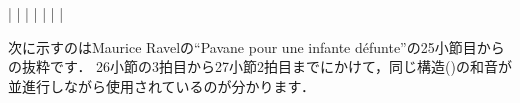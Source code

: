 \documentclass[dvipdfmx,uplatex,b5paper,openany,jbase=12Q,nomag*,textwidth-limit=44%
               ]{gachimuchi}
\begin{document}
\begin{Music}
  \generalmeter{\meterC}%
  \Startpiece%
  \NOTEs
  |%
  \en\bar
  \NOTEs
  |%
  \en\bar
  \NOTEs
  |%
  \en\bar
  \NOTEs
  |%
  \en\setdoublebar
  \endpiece\vspace{-.5\baselineskip}%
\end{Music}

次に示すのはMaurice Ravelの``Pavane pour une infante défunte''の25小節目からの抜粋です．
26小節の3拍目から27小節2拍目までにかけて，同じ構造(\txSqr{})の和音が並進行しながら使用されているのが分かります．
\end{document}
